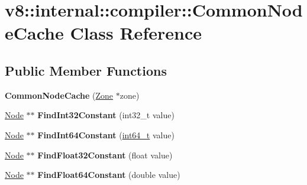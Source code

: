 \hypertarget{classv8_1_1internal_1_1compiler_1_1CommonNodeCache}{}\section{v8\+:\+:internal\+:\+:compiler\+:\+:Common\+Node\+Cache Class Reference}
\label{classv8_1_1internal_1_1compiler_1_1CommonNodeCache}
\subsection*{Public Member Functions}
\begin{DoxyCompactItemize}
\item 
\mbox{\label{classv8_1_1internal_1_1compiler_1_1CommonNodeCache_a7b060a6fa1a819e054c6f6d077a24698}} 
{\bfseries Common\+Node\+Cache} (\mbox{\hyperlink{classv8_1_1internal_1_1Zone}{Zone}} $\ast$zone)
\item 
\mbox{\label{classv8_1_1internal_1_1compiler_1_1CommonNodeCache_a6c45b23038d39b61834b4032a61d0985}} 
\mbox{\hyperlink{classv8_1_1internal_1_1compiler_1_1Node}{Node}} $\ast$$\ast$ {\bfseries Find\+Int32\+Constant} (int32\+\_\+t value)
\item 
\mbox{\label{classv8_1_1internal_1_1compiler_1_1CommonNodeCache_a1454722b75ad5486b57e19503aa87ed9}} 
\mbox{\hyperlink{classv8_1_1internal_1_1compiler_1_1Node}{Node}} $\ast$$\ast$ {\bfseries Find\+Int64\+Constant} (\mbox{\hyperlink{classint64__t}{int64\+\_\+t}} value)
\item 
\mbox{\label{classv8_1_1internal_1_1compiler_1_1CommonNodeCache_ad883d0e15ad2d83ffe2c70efee0f8fcb}} 
\mbox{\hyperlink{classv8_1_1internal_1_1compiler_1_1Node}{Node}} $\ast$$\ast$ {\bfseries Find\+Float32\+Constant} (float value)
\item 
\mbox{\label{classv8_1_1internal_1_1compiler_1_1CommonNodeCache_a35ff1bcea9ca5228c771cfe0f64ad0a7}} 
\mbox{\hyperlink{classv8_1_1internal_1_1compiler_1_1Node}{Node}} $\ast$$\ast$ {\bfseries Find\+Float64\+Constant} (double value)

\end{DoxyCompactItemize}
